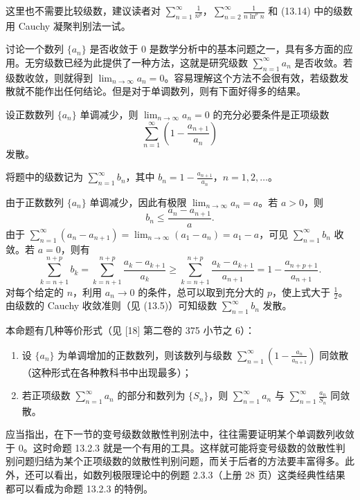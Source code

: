 \begin{xremark}
这里也不需要比较级数，建议读者对 $\sum_{n=1}^{\infty}\frac1{n^p}$，$\sum_{n=2}^{\infty}\frac1{n\ln^p n}$ 和 (13.14) 中的级数用 Cauchy 凝聚判别法一试。
\end{xremark}

讨论一个数列 $\{a_n\}$ 是否收敛于 0 是数学分析中的基本问题之一，具有多方面的应用。无穷级数已经为此提供了一种方法，这就是研究级数 $\sum_{n=1}^{\infty}a_n$ 是否收敛。若级数收敛，则就得到 $\lim_{n\to\infty}a_n=0$。容易理解这个方法不会很有效，若级数发散就不能作出任何结论。但是对于单调数列，则有下面好得多的结果。

\begin{xproposition}
设正数数列 $\{a_n\}$ 单调减少，则 $\lim_{n\to\infty}a_n=0$ 的充分必要条件是正项级数
\[
\sum_{n=1}^{\infty}\left(1-\frac{a_{n+1}}{a_n}\right)
\]
发散。
\end{xproposition}
\begin{xproof}
将题中的级数记为 $\sum_{n=1}^{\infty}b_n$，其中 $b_n=1-\frac{a_{n+1}}{a_n}$，$n=1,2,\ldots$。

由于正数数列 $\{a_n\}$ 单调减少，因此有极限 $\lim_{n\to\infty}a_n=a$。若 $a>0$，则
\[
b_n\leq\frac{a_n-a_{n+1}}a.
\]
由于 $\sum_{n=1}^{\infty}(a_n-a_{n+1})=\lim_{n\to\infty}(a_1-a_n)=a_1-a$，可见 $\sum_{n=1}^{\infty}b_n$ 收敛。若 $a=0$，则有
\[
\sum_{k=n+1}^{n+p}b_k=\sum_{k=n+1}^{n+p}\frac{a_k-a_{k+1}}{a_k}\geq\sum_{k=n+1}^{n+p}\frac{a_k-a_{k+1}}{a_{n+1}}=1-\frac{a_{n+p+1}}{a_{n+1}}.
\]
对每个给定的 $n$，利用 $a_n\to0$ 的条件，总可以取到充分大的 $p$，使上式大于 $\frac12$。由级数的 Cauchy 收敛准则（见 (13.5)）可知级数 $\sum_{n=1}^{\infty}b_n$ 发散。
\end{xproof}

\begin{xremark}
本命题有几种等价形式（见 [18] 第二卷的 375 小节之 6）：
\begin{enumerate}[label=(\arabic*)]
\item 设 $\{a_n\}$ 为单调增加的正数数列，则该数列与级数 $\sum_{n=1}^{\infty}\left(1-\frac{a_n}{a_{n+1}}\right)$ 同敛散（这种形式在各种教科书中出现最多）；
\item 若正项级数 $\sum_{n=1}^{\infty}a_n$ 的部分和数列为 $\{S_n\}$，则 $\sum_{n=1}^{\infty}a_n$ 与 $\sum_{n=1}^{\infty}\frac{a_n}{S_n}$ 同敛散。
\end{enumerate}
\end{xremark}

\begin{xremark}
应当指出，在下一节的变号级数敛散性判别法中，往往需要证明某个单调数列收敛于 0。这时命题 13.2.3 就是一个有用的工具。这样就可能将变号级数的敛散性判别问题归结为某个正项级数的敛散性判别问题，而关于后者的方法要丰富得多。此外，还可以看出，如数列极限理论中的例题 2.3.3（上册 28 页）这类经典性结果都可以看成为命题 13.2.3 的特例。
\end{xremark}

